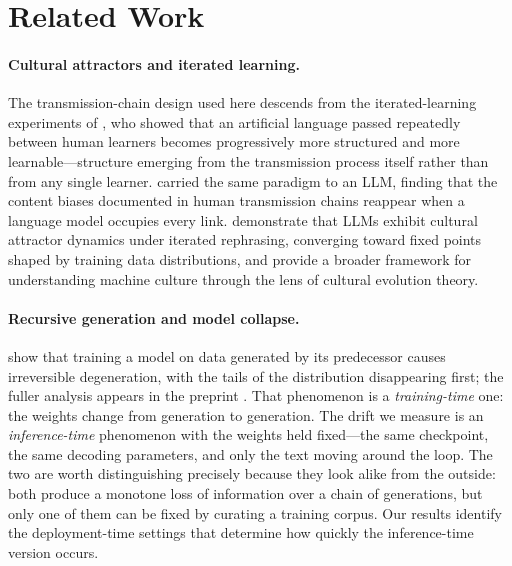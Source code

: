 \documentclass[11pt]{article}
\begin{document}
\section{Related Work}
\label{sec:related}

\paragraph{Cultural attractors and iterated learning.}
The transmission-chain design used here descends from the iterated-learning
experiments of \citet{kirby2008cumulative}, who showed that an artificial
language passed repeatedly between human learners becomes progressively more
structured and more learnable---structure emerging from the transmission process
itself rather than from any single learner. \citet{acerbi2023content} carried the
same paradigm to an LLM, finding that the content biases documented in human
transmission chains reappear when a language model occupies every link.
\citet{perez2025cultural} demonstrate that LLMs exhibit cultural attractor dynamics
under iterated rephrasing, converging toward fixed points shaped by training data
distributions, and \citet{brinkmann2023machine} provide a broader framework for
understanding machine culture through the lens of cultural evolution theory.

\paragraph{Recursive generation and model collapse.}
\citet{shumailov2024collapse} show that training a model on data generated by its
predecessor causes irreversible degeneration, with the tails of the distribution
disappearing first; the fuller analysis appears in the preprint
\citep{shumailov2023curse}. That phenomenon is a \emph{training-time} one: the
weights change from generation to generation. The drift we measure is an
\emph{inference-time} phenomenon with the weights held fixed---the same
checkpoint, the same decoding parameters, and only the text moving around the
loop. The two are worth distinguishing precisely because they look alike from the
outside: both produce a monotone loss of information over a chain of generations,
but only one of them can be fixed by curating a training corpus. Our results
identify the deployment-time settings that determine how quickly the
inference-time version occurs.
\end{document}
